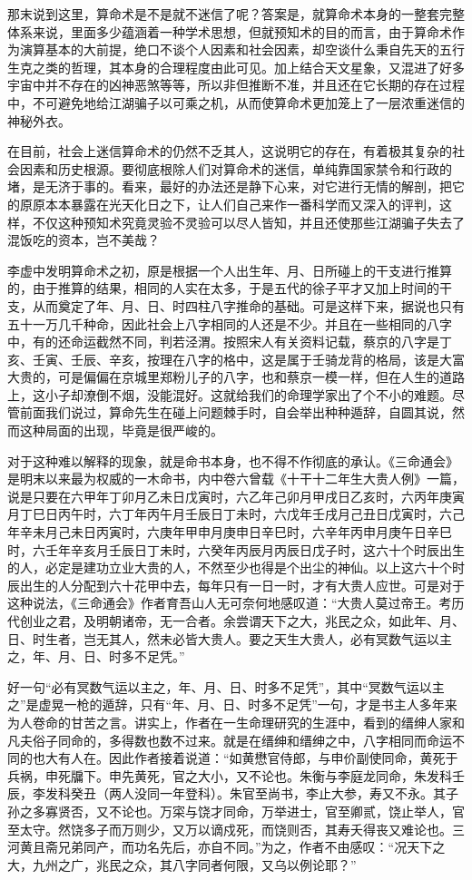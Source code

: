 \documentclass[a5paper,oneside,12pt]{ctexbook}
\begin{document}
{{那末说到这里，算命术是不是就不迷信了呢？答案是，就算命术本身的一整套完整体系来说，里面多少蕴涵着一种学术思想，但就预知术的目的而言，由于算命术作为演算基本的大前提，绝口不谈个人因素和社会因素，却空谈什么秉自先天的五行生克之类的哲理，其本身的合理程度由此可见。加上结合天文星象，又混进了好多宇宙中并不存在的凶神恶煞等等，所以非但推断不准，并且还在它长期的存在过程中，不可避免地给江湖骗子以可乘之机，从而使算命术更加笼上了一层浓重迷信的神秘外衣。

在目前，社会上迷信算命术的仍然不乏其人，这说明它的存在，有着极其复杂的社会因素和历史根源。要彻底根除人们对算命术的迷信，单纯靠国家禁令和行政的堵，是无济于事的。看来，最好的办法还是静下心来，对它进行无情的解剖，把它的原原本本暴露在光天化日之下，让人们自己来作一番科学而又深入的评判，这样，不仅这种预知术究竟灵验不灵验可以尽人皆知，并且还使那些江湖骗子失去了混饭吃的资本，岂不美哉？

李虚中发明算命术之初，原是根据一个人出生年、月、日所碰上的干支进行推算的，由于推算的结果，相同的人实在太多，于是五代的徐子平才又加上时间的干支，从而奠定了年、月、日、时四柱八字推命的基础。可是这样下来，据说也只有五十一万几千种命，因此社会上八字相同的人还是不少。并且在一些相同的八字中，有的还命运截然不同，判若泾渭。按照宋人有关资料记载，蔡京的八字是丁亥、壬寅、壬辰、辛亥，按理在八字的格中，这是属于壬骑龙背的格局，该是大富大贵的，可是偏偏在京城里郑粉儿子的八字，也和蔡京一模一样，但在人生的道路上，这小子却潦倒不烟，没能混好。这就给我们的命理学家出了个不小的难题。尽管前面我们说过，算命先生在碰上问题棘手时，自会举出种种遁辞，自圆其说，然而这种局面的出现，毕竟是很严峻的。

对于这种难以解释的现象，就是命书本身，也不得不作彻底的承认。《三命通会》是明末以来最为权威的一木命书，内中卷六曾载《十干十二年生大贵人例》一篇，说是只要在六甲年丁卯月乙未日戊寅时，六乙年己卯月甲戌日乙亥时，六丙年庚寅月丁巳日丙午时，六丁年丙午月壬辰日丁未时，六戊年壬戌月己丑日戊寅时，六己年辛未月己未日丙寅时，六庚年甲申月庚申日辛巳时，六辛年丙申月庚午日辛巳时，六壬年辛亥月壬辰日丁未时，六癸年丙辰月丙辰日戊子时，这六十个时辰出生的人，必定是建功立业大贵的人，不然至少也得是个出尘的神仙。以上这六十个时辰出生的人分配到六十花甲中去，每年只有一日一时，才有大贵人应世。可是对于这种说法，《三命通会》作者育吾山人无可奈何地感叹道：“大贵人莫过帝王。考历代创业之君，及明朝诸帝，无一合者。余尝谓天下之大，兆民之众，如此年、月、日、时生者，岂无其人，然未必皆大贵人。要之天生大贵人，必有冥数气运以主之，年、月、日、时多不足凭。”

好一句“必有冥数气运以主之，年、月、日、时多不足凭”，其中“冥数气运以主之”是虚晃一枪的遁辞，只有“年、月、日、时多不足凭”一句，才是书主人多年来为人卷命的甘苦之言。讲实上，作者在一生命理研究的生涯中，看到的缙绅人家和凡夫俗子同命的，多得数也数不过来。就是在缙绅和缙绅之中，八字相同而命运不同的也大有人在。因此作者接着说道：“如黄懋官侍郎，与申价副使同命，黄死于兵祸，申死牖下。申先黄死，官之大小，又不论也。朱衡与李庭龙同命，朱发科壬辰，李发科癸丑（两人没同一年登科）。朱官至尚书，李止大参，寿又不永。其子孙之多寡贤否，又不论也。万寀与饶才同命，万举进士，官至卿贰，饶止举人，官至太守。然饶多子而万则少，又万以谪戍死，而饶则否，其寿夭得丧又难论也。三河黄且斋兄弟同产，而功名先后，亦自不同。”为之，作者不由感叹：“况天下之大，九州之广，兆民之众，其八字同者何限，又乌以例论耶？”

}}
\end{document}
